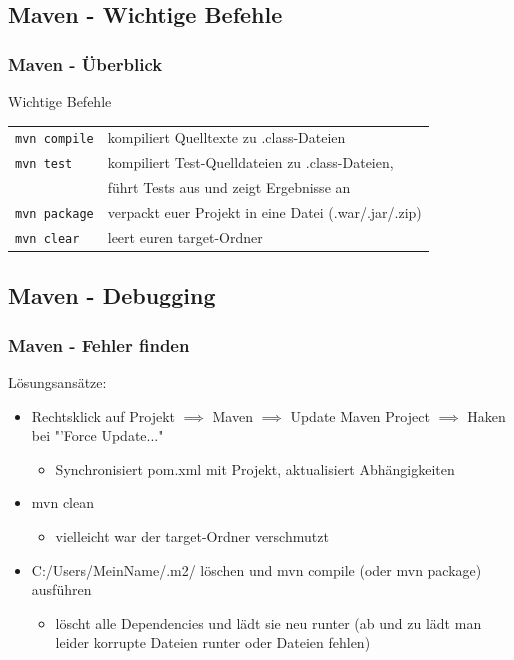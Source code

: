 \documentclass[18pt]{beamer}
\begin{document}
	\subsection{Maven - Wichtige Befehle}
	\begin{frame}
		\frametitle{Maven - Überblick}
		\begin{block}{Wichtige Befehle}
			\begin{tabular}{ll}
				\texttt{mvn compile} & kompiliert Quelltexte zu .class-Dateien \\
				\texttt{mvn test} & kompiliert Test-Quelldateien zu .class-Dateien, \\ & führt Tests aus und zeigt Ergebnisse an \\
				\texttt{mvn package} & verpackt euer Projekt in eine Datei (.war/.jar/.zip) \\ 
				\texttt{mvn clear} & leert euren target-Ordner \\
			\end{tabular}
		\end{block}
	\end{frame}
	
	\subsection{Maven - Debugging}
	\begin{frame}
		\frametitle{Maven - Fehler finden}
		Lösungsansätze:
		\begin{itemize}
			\item Rechtsklick auf Projekt $\implies$ Maven $\implies$ Update Maven Project $\implies$ Haken bei "'Force Update..." 
			\begin{itemize}
				\item Synchronisiert pom.xml mit Projekt, aktualisiert Abhängigkeiten
			\end{itemize}
			\item mvn clean
			\begin{itemize}
				\item vielleicht war der target-Ordner verschmutzt
			\end{itemize}
			\item C:/Users/MeinName/.m2/ löschen und mvn compile (oder mvn package) ausführen
			\begin{itemize}
				\item löscht alle Dependencies und lädt sie neu runter (ab und zu lädt man leider korrupte Dateien runter oder Dateien fehlen)
			\end{itemize}
		\end{itemize}
	\end{frame}
\end{document}

